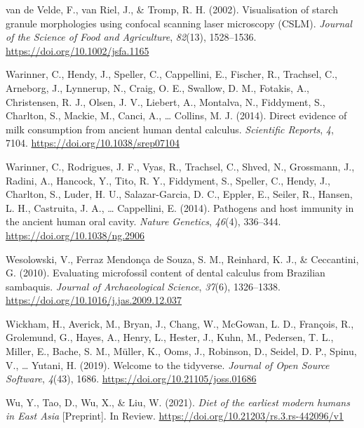 \documentclass[
  letterpaper,
]{book}
\newlength{\cslhangindent}
\newlength{\cslentryspacingunit} %
\newenvironment{CSLReferences}[2] %
 {%
  \setlength{\parindent}{0pt}
  \ifodd #1
  \let\oldpar\par
  \def\par{\hangindent=\cslhangindent\oldpar}
  \fi
  \setlength{\parskip}{#2\cslentryspacingunit}
 }%
 {}
\begin{document}
\begin{CSLReferences}{1}{0}
\leavevmode{}%
van de Velde, F., van Riel, J., \& Tromp, R. H. (2002). Visualisation of
starch granule morphologies using confocal scanning laser microscopy
({CSLM}). \emph{Journal of the Science of Food and Agriculture},
\emph{82}(13), 1528--1536. \url{https://doi.org/10.1002/jsfa.1165}

\leavevmode{}%
Warinner, C., Hendy, J., Speller, C., Cappellini, E., Fischer, R.,
Trachsel, C., Arneborg, J., Lynnerup, N., Craig, O. E., Swallow, D. M.,
Fotakis, A., Christensen, R. J., Olsen, J. V., Liebert, A., Montalva,
N., Fiddyment, S., Charlton, S., Mackie, M., Canci, A., \ldots{}
Collins, M. J. (2014). Direct evidence of milk consumption from ancient
human dental calculus. \emph{Scientific Reports}, \emph{4}, 7104.
\url{https://doi.org/10.1038/srep07104}

\leavevmode{}%
Warinner, C., Rodrigues, J. F., Vyas, R., Trachsel, C., Shved, N.,
Grossmann, J., Radini, A., Hancock, Y., Tito, R. Y., Fiddyment, S.,
Speller, C., Hendy, J., Charlton, S., Luder, H. U., Salazar-Garcia, D.
C., Eppler, E., Seiler, R., Hansen, L. H., Castruita, J. A., \ldots{}
Cappellini, E. (2014). Pathogens and host immunity in the ancient human
oral cavity. \emph{Nature Genetics}, \emph{46}(4), 336--344.
\url{https://doi.org/10.1038/ng.2906}

\leavevmode{}%
Wesolowski, V., Ferraz Mendonça de Souza, S. M., Reinhard, K. J., \&
Ceccantini, G. (2010). Evaluating microfossil content of dental calculus
from {Brazilian} sambaquis. \emph{Journal of Archaeological Science},
\emph{37}(6), 1326--1338.
\url{https://doi.org/10.1016/j.jas.2009.12.037}

\leavevmode{}%
Wickham, H., Averick, M., Bryan, J., Chang, W., McGowan, L. D.,
François, R., Grolemund, G., Hayes, A., Henry, L., Hester, J., Kuhn, M.,
Pedersen, T. L., Miller, E., Bache, S. M., Müller, K., Ooms, J.,
Robinson, D., Seidel, D. P., Spinu, V., \ldots{} Yutani, H. (2019).
Welcome to the {tidyverse}. \emph{Journal of Open Source Software},
\emph{4}(43), 1686. \url{https://doi.org/10.21105/joss.01686}

\leavevmode{}%
Wu, Y., Tao, D., Wu, X., \& Liu, W. (2021). \emph{Diet of the earliest
modern humans in {East Asia}} {[}Preprint{]}. {In Review}.
\url{https://doi.org/10.21203/rs.3.rs-442096/v1}

\end{CSLReferences}
\end{document}

